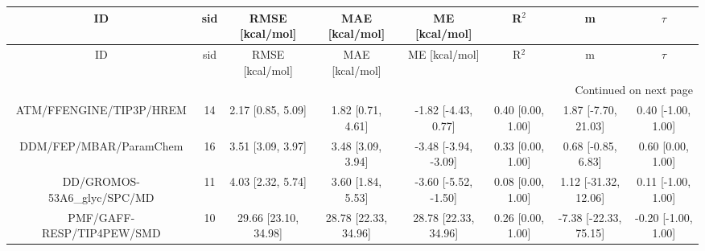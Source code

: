 \documentclass[8pt]{article}
\begin{document}
\begin{center}
\begin{footnotesize}
\begin{longtable}{|cccccccc|}
\toprule
                         ID & sid &      RMSE [kcal/mol] &       MAE [kcal/mol] &        ME [kcal/mol] &             R$^2$ &                     m &              $\tau$ \\
\midrule
\endfirsthead

\toprule
                         ID & sid &      RMSE [kcal/mol] &       MAE [kcal/mol] &        ME [kcal/mol] &             R$^2$ &                     m &              $\tau$ \\
\midrule
\endhead
\midrule
\multicolumn{8}{r}{{Continued on next page}} \\
\midrule
\endfoot

\bottomrule
\endlastfoot
    ATM/FFENGINE/TIP3P/HREM &  14 &    2.17 [0.85, 5.09] &    1.82 [0.71, 4.61] &  -1.82 [-4.43, 0.77] & 0.40 [0.00, 1.00] &   1.87 [-7.70, 21.03] &  0.40 [-1.00, 1.00] \\
     DDM/FEP/MBAR/ParamChem &  16 &    3.51 [3.09, 3.97] &    3.48 [3.09, 3.94] & -3.48 [-3.94, -3.09] & 0.33 [0.00, 1.00] &    0.68 [-0.85, 6.83] &   0.60 [0.00, 1.00] \\
DD/GROMOS-53A6\_glyc/SPC/MD &  11 &    4.03 [2.32, 5.74] &    3.60 [1.84, 5.53] & -3.60 [-5.52, -1.50] & 0.08 [0.00, 1.00] &  1.12 [-31.32, 12.06] &  0.11 [-1.00, 1.00] \\
  PMF/GAFF-RESP/TIP4PEW/SMD &  10 & 29.66 [23.10, 34.98] & 28.78 [22.33, 34.96] & 28.78 [22.33, 34.96] & 0.26 [0.00, 1.00] & -7.38 [-22.33, 75.15] & -0.20 [-1.00, 1.00] \\
\end{longtable}
\end{footnotesize}
\end{center}
\end{document}
